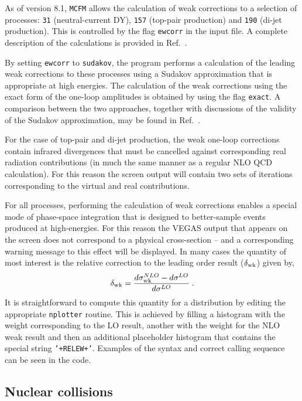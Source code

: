 As of version 8.1, {\tt MCFM} allows the calculation of weak corrections to a
selection of processes: {\tt 31} (neutral-current DY),
{\tt 157} (top-pair production) and {\tt 190} (di-jet production).
This is controlled by the flag {\tt ewcorr} in the input file.  A complete description
of the calculations is provided in Ref.~\cite{Campbell:2016dks}.

By setting {\tt ewcorr} to {\tt sudakov}, the program performs a calculation of
the leading weak corrections to these processes using a Sudakov approximation that
is appropriate at high energies.   The calculation of the weak corrections using the
exact form of the one-loop amplitudes is obtained by using the flag {\tt exact}.
A comparison between the two approaches, together with discussions of the validity of
the Sudakov approximation, may be found in Ref.~\cite{Campbell:2016dks}.

For the case of top-pair and di-jet production, the weak one-loop corrections contain
infrared divergences that must be cancelled against corresponding real radiation
contributions (in much the same manner as a regular NLO QCD calculation).  For this
reason the screen output will contain two sets of iterations corresponding to the
virtual and real contributions.

For all processes, performing the calculation of weak
corrections enables a special mode of phase-space integration that is designed to
better-sample events produced at high-energies.  For this reason the VEGAS output that
appears on the screen does not correspond to a physical cross-section -- and a corresponding
warning message to this effect will be displayed.  In many cases the quantity of most interest
is the relative correction to the leading order result ($\delta_{\rm wk}$) given by,
\begin{equation}
\delta_{\rm wk} = \frac{d\sigma_{\rm wk}^{NLO} - d\sigma^{LO}}{d\sigma^{LO}} \;.
\end{equation}
It is straightforward to compute this quantity for a distribution by editing the appropriate
{\tt nplotter} routine.  This is achieved by filling a histogram with the weight corresponding
to the LO result, another with the weight for the NLO weak result and then an additional placeholder
histogram that contains the special string {\tt '+RELEW+'}.  Examples of the syntax and correct calling
sequence can be seen in the code.


\subsection{Nuclear collisions}
\label{sec:nucleus}

